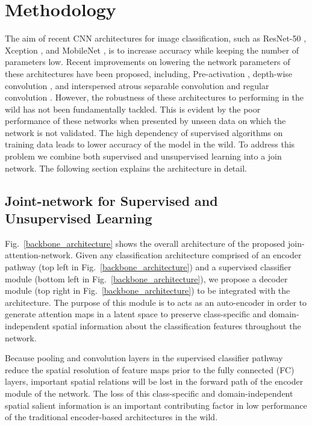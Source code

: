 \documentclass{article}
\begin{document}
\section{Methodology}
The aim of recent CNN architectures for image classification, such as ResNet-50 \cite{he2016deep}, Xception \cite{chollet2017xception}, and MobileNet \cite{sandler2018mobilenetv2}, is to increase accuracy while keeping the number of parameters low. Recent improvements on lowering the network parameters of these architectures have been proposed, including, Pre-activation \cite{he2016identity}, depth-wise convolution \cite{kaiser2017depthwise}, and interspersed atrous separable convolution and regular convolution \cite{kamran2019optic}. However, the robustness of these architectures to performing in the wild has not been fundamentally tackled. This is evident by the poor performance of these networks when presented by unseen data on which the network is not validated. The high dependency of supervised algorithms on training data leads to lower accuracy of the model in the wild. To address this problem we combine both supervised and unsupervised learning into a join network. The following section explains the architecture in detail.

\subsection{Joint-network for Supervised and Unsupervised Learning}
Fig.~\ref{backbone_architecture} shows the overall architecture of the proposed join-attention-network. Given any classification architecture comprised of an encoder pathway (top left in Fig.~\ref{backbone_architecture}) and a supervised classifier module (bottom left in Fig.~\ref{backbone_architecture}), we propose a decoder module (top right in Fig.~\ref{backbone_architecture}) to be integrated with the architecture. The purpose of this module is to acts as an auto-encoder in order to generate attention maps in a latent space to preserve class-specific and domain-independent spatial information about the classification features throughout the network. 

Because pooling and convolution layers in the supervised classifier pathway reduce the spatial resolution of feature maps prior to the fully connected (FC) layers, important spatial relations will be lost in the forward path of the encoder module of the network. The loss of this class-specific and domain-independent spatial salient information is an important contributing factor in low performance of the traditional encoder-based architectures in the wild. 
\end{document}
